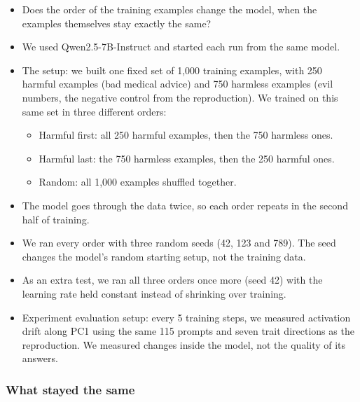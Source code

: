\documentclass[10pt]{article}
\begin{document}
\begin{itemize}
  \item Does the order of the training examples change the model, when the examples themselves
  stay exactly the same?
  \item We used Qwen2.5-7B-Instruct and started each run from the same model.
  \item The setup: we built one fixed set of 1,000 training examples, with 250 harmful examples
  (bad medical advice) and 750 harmless examples (evil numbers, the negative control from the
  reproduction). We trained on this same set in three different orders:
  \begin{itemize}
    \item Harmful first: all 250 harmful examples, then the 750 harmless ones.
    \item Harmful last: the 750 harmless examples, then the 250 harmful ones.
    \item Random: all 1,000 examples shuffled together.
  \end{itemize}
  \item The model goes through the data twice, so each order repeats in the second half of
  training.
  \item We ran every order with three random seeds (42, 123 and 789). The seed changes the
  model's random starting setup, not the training data.
  \item As an extra test, we ran all three orders once more (seed 42) with the learning rate held
  constant instead of shrinking over training.
  \item Experiment evaluation setup: every 5 training steps, we measured activation drift along PC1
  using the same 115 prompts and seven trait directions as the reproduction. We measured changes
  inside the model, not the quality of its answers.
\end{itemize}

\subsubsection{What stayed the same}
\end{document}
